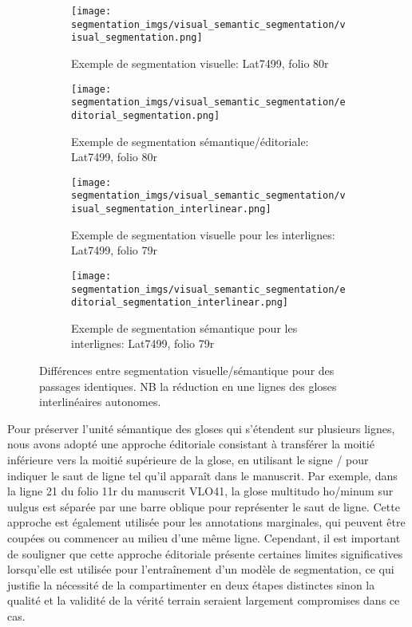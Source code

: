 \documentclass[a4paper, twoside, 12pt]{book}
\begin{document}
\begin{figure}
    \centering
    
    \begin{subfigure}[b]{0.4\textwidth}
        \centering
        \texttt{[image: segmentation\_imgs/visual\_semantic\_segmentation/visual\_segmentation.png]}
        \caption{Exemple de segmentation visuelle: Lat7499, folio 80r}
        \label{visual_segmentation}
    \end{subfigure}
    \begin{subfigure}[b]{0.4\textwidth}
        \centering
        \texttt{[image: segmentation\_imgs/visual\_semantic\_segmentation/editorial\_segmentation.png]}
        \caption{Exemple de segmentation sémantique/éditoriale: Lat7499, folio 80r}
        \label{subfig:sub2}
    \end{subfigure}
    
    
    \begin{subfigure}[b]{0.4\textwidth}
        \centering
        \texttt{[image: segmentation\_imgs/visual\_semantic\_segmentation/visual\_segmentation\_interlinear.png]}
        \caption{Exemple de segmentation visuelle pour les interlignes: Lat7499, folio 79r}
        \label{subfig:sub3}
    \end{subfigure}
    \begin{subfigure}[b]{0.4\textwidth}
        \centering
        \texttt{[image: segmentation\_imgs/visual\_semantic\_segmentation/editorial\_segmentation\_interlinear.png]}
        \caption{Exemple de segmentation sémantique pour les interlignes: Lat7499, folio 79r}
        \label{subfig:sub4}
    \end{subfigure}
    
    \caption{Différences entre segmentation visuelle/sémantique pour des passages identiques. NB la réduction en une lignes des gloses interlinéaires autonomes.}
    \label{fig:main}
\end{figure}


Pour préserver l'unité sémantique des gloses qui s'étendent sur plusieurs lignes, nous avons adopté une approche éditoriale consistant à transférer la moitié inférieure vers la moitié supérieure de la glose, en utilisant le signe \og{}/\fg{} pour indiquer le saut de ligne tel qu'il apparaît dans le manuscrit. Par exemple, dans la ligne 21 du folio 11r du manuscrit VLO41, la glose \og{}multitudo ho/minum\fg{} sur \og{}uulgus\fg{} est séparée par une barre oblique pour représenter le saut de ligne. Cette approche est également utilisée pour les annotations marginales, qui peuvent être coupées ou commencer au milieu d'une même ligne. Cependant, il est important de souligner que cette approche éditoriale présente certaines limites significatives lorsqu'elle est utilisée pour l'entraînement d'un modèle de segmentation, ce qui justifie la nécessité de la compartimenter en deux étapes distinctes sinon la qualité et la validité de la vérité terrain seraient largement compromises dans ce cas.\\
\end{document}
